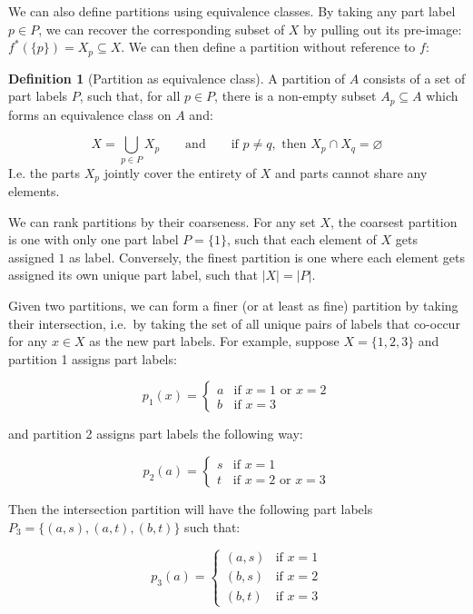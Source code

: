 \documentclass[
]{book}
\theoremstyle{definition}
\newtheorem{definition}{Definition}[chapter]
\theoremstyle{definition}
\theoremstyle{definition}
\theoremstyle{definition}
\theoremstyle{remark}
\begin{document}
We can also define partitions using equivalence classes. By taking any part label \(p \in P\), we can recover the corresponding subset of \(X\) by pulling out its pre-image: \(f^*(\{p\}) = X_p \subseteq X\). We can then define a partition without reference to \(f\):

\begin{definition}[Partition as equivalence class]
A partition of \(A\) consists of a set of part labels \(P\), such that, for all \(p \in P\), there is a non-empty subset \(A_p \subseteq A\) which forms an equivalence class on \(A\) and:

\[X = \bigcup_{p \in P} X_p \qquad \text{and} \qquad \text{if } p \neq q, \text{ then } X_p \cap X_q = \varnothing\]
I.e. the parts \(X_p\) jointly cover the entirety of \(X\) and parts cannot share any elements.
\end{definition}

We can rank partitions by their coarseness. For any set \(X\), the coarsest partition is one with only one part label \(P = \{ 1 \}\), such that each element of \(X\) gets assigned \(1\) as label. Conversely, the finest partition is one where each element gets assigned its own unique part label, such that \(\lvert X \lvert = \lvert P \lvert\).

Given two partitions, we can form a finer (or at least as fine) partition by taking their intersection, i.e.~by taking the set of all unique pairs of labels that co-occur for any \(x \in X\) as the new part labels. For example, suppose \(X = \{ 1, 2, 3 \}\) and partition 1 assigns part labels:

\[p_1(x) = \begin{cases} 
a & \text{if } x = 1 \text{ or } x = 2 \\
b & \text{if } x = 3
\end{cases}\]

and partition 2 assigns part labels the following way:

\[
p_2(a) = \begin{cases}
s & \text{if } x = 1 \\
t & \text{if } x = 2 \text{ or } x = 3
\end{cases}
\]

Then the intersection partition will have the following part labels \(P_3 = \{ (a, s), (a, t), (b, t) \}\) such that:

\[
p_3(a) = \begin{cases}
(a, s) & \text{if } x = 1 \\
(b, s) & \text{if } x = 2 \\ 
(b, t) & \text{if } x = 3
\end{cases}
\]
\end{document}
